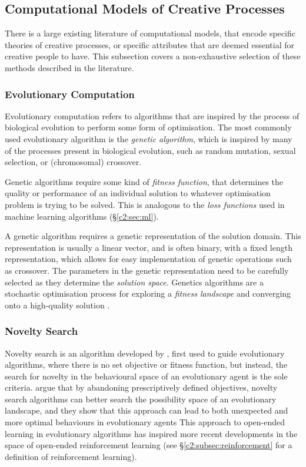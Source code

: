 \subsection{Computational Models of Creative Processes}

There is a large existing literature of computational models, that encode specific theories of creative processes, or specific attributes that are deemed essential for creative people to have. 
This subsection covers a non-exhaustive selection of these methods described in the literature.

\subsubsection{Evolutionary Computation}

Evolutionary computation refers to algorithms that are inspired by the process of biological evolution to perform some form of optimisation. 
The most commonly used evolutionary algorithm is the \textit{genetic algorithm}, which is inspired by many of the processes present in biological evolution, such as random mutation, sexual selection, or (chromosomal) crossover.

Genetic algorithms require some kind of \textit{fitness function}, that determines the quality or performance of an individual solution to whatever optimisation problem is trying to be solved. This is analogous to the \textit{loss functions} used in machine learning algorithms (\S \ref{c2:sec:ml}). 

A genetic algorithm requires a genetic representation of the solution domain. 
This representation is usually a linear vector, and is often binary, with a fixed length representation, which allows for easy implementation of genetic operations such as crossover. 
The parameters in the genetic representation need to be carefully selected as they determine the \textit{solution space}.
Genetics algorithms are a stochastic optimisation process for exploring a \textit{fitness landscape} and converging onto a high-quality solution \citep{back1996evolutionary}.

\subsubsection{Novelty Search}

Novelty search is an algorithm developed by \cite{lehman2008exploiting}, first used to guide evolutionary algorithms, where there is no set objective or fitness function, but instead, the search for novelty in the behavioural space of an evolutionary agent is the sole criteria. \cite{lehman2010efficiently, lehman2011novelty, lehman2011abandoning} argue that by abandoning prescriptively defined objectives, novelty search algorithms can better search the possibility space of an evolutionary landscape, and they show that this approach can lead to both unexpected and more optimal behaviours in evolutionary agents This approach to open-ended learning in evolutionary algorithms has inspired more recent developments in the space of open-ended reinforcement learning \citep{wang2020enhanced} (see \S \ref{c2:subsec:reinforcement} for a definition of reinforcement learning).

